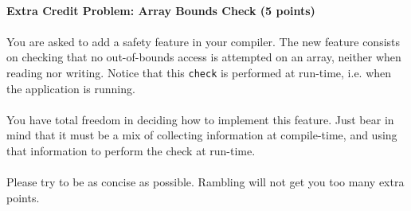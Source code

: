 
\paragraph{Extra Credit Problem: Array Bounds Check (5 points)}

\paragraph{}
You are asked to add a safety feature in your compiler. The new feature
consists on checking that no out-of-bounds access is attempted on an array, neither when reading nor writing.
Notice that this \texttt{check} is performed at run-time, i.e. when the application
is running.

\paragraph{}
You have total freedom in deciding how to implement this feature. Just bear in mind 
that it must be a mix of collecting information at compile-time, and using that
information to perform the check at run-time.

\paragraph{}
Please try to be as concise as possible. Rambling will not get you too many extra points.

\begin{tcolorbox}[height=6.5in]

\end{tcolorbox}
